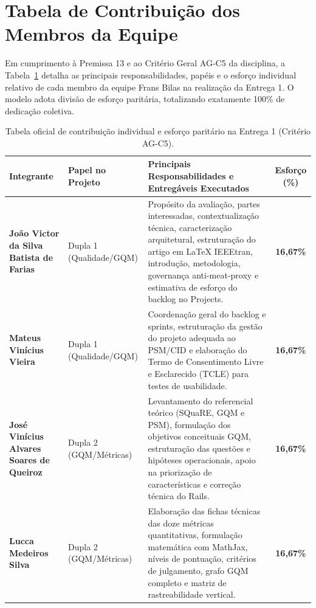 \documentclass[journal]{IEEEtran}
\begin{document}



\appendices

\section{Tabela de Contribuição dos Membros da Equipe}
\label{app:contribuicao}

Em cumprimento à Premissa 13 e ao Critério Geral AG-C5 da disciplina, a Tabela~\ref{tab:contribuicao_equipe} detalha as principais responsabilidades, papéis e o esforço individual relativo de cada membro da equipe Frans Bilas na realização da Entrega 1. O modelo adota divisão de esforço paritária, totalizando exatamente 100\% de dedicação coletiva.

\begin{table}[!t]
\centering
\caption{Tabela oficial de contribuição individual e esforço paritário na Entrega 1 (Critério AG-C5).}
\label{tab:contribuicao_equipe}
\small
\begin{tabular}{@{}p{} p{} p{} c@{}}
\toprule
\textbf{Integrante} & \textbf{Papel no Projeto} & \textbf{Principais Responsabilidades e Entregáveis Executados} & \textbf{Esforço (\%)} \\
\midrule
\textbf{João Victor da Silva Batista de Farias} & Dupla 1 (Qualidade/GQM) & Propósito da avaliação, partes interessadas, contextualização técnica, caracterização arquitetural, estruturação do artigo em LaTeX IEEEtran, introdução, metodologia, governança anti-meat-proxy e estimativa de esforço do backlog no Projects. & \textbf{16,67\%} \\
\midrule
\textbf{Mateus Vinícius Vieira} & Dupla 1 (Qualidade/GQM) & Coordenação geral do backlog e sprints, estruturação da gestão do projeto adequada ao PSM/CID e elaboração do Termo de Consentimento Livre e Esclarecido (TCLE) para testes de usabilidade. & \textbf{16,67\%} \\
\midrule
\textbf{José Vinícius Alvares Soares de Queiroz} & Dupla 2 (GQM/Métricas) & Levantamento do referencial teórico (SQuaRE, GQM e PSM), formulação dos objetivos conceituais GQM, estruturação das questões e hipóteses operacionais, apoio na priorização de características e correção técnica do Rails. & \textbf{16,67\%} \\
\midrule
\textbf{Lucca Medeiros Silva} & Dupla 2 (GQM/Métricas) & Elaboração das fichas técnicas das doze métricas quantitativas, formulação matemática com MathJax, níveis de pontuação, critérios de julgamento, grafo GQM completo e matriz de rastreabilidade vertical. & \textbf{16,67\%} \\

\end{tabular}
\end{table}
\end{document}
